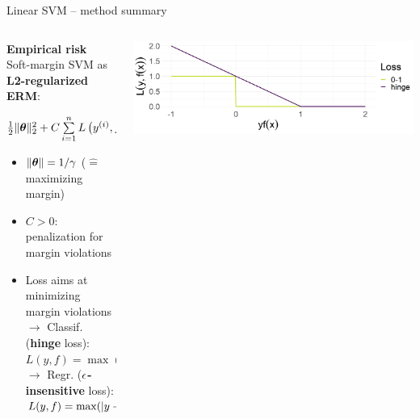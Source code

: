 \documentclass[11pt,compress,t,notes=noshow, xcolor=table]{beamer}
\newcommand{\highlight}[1]{\textcolor{hlcol}{\textbf{#1}}}
\begin{document}
\begin{vbframe}{Linear SVM -- method summary}
\begin{columns}[T, totalwidth = \textwidth]
\begin{column}{0.61\textwidth}
\highlight{Empirical risk} ~~ Soft-margin SVM as \textbf{L2-regularized ERM}: 
   \centerline{$\frac{1}{2} \|\bm{\theta}\|_2^2 + C \sum\limits_{i=1}^n L\left(y^{(i)}, f\left(\mathbf{x}^{(i)}\right)\right)$}
   \vspace{-\topsep}
\begin{itemize}
\setlength{\parskip}{0pt} 
\setlength{\itemsep}{0pt plus 1pt}
  \item $\|\bm{\theta}\| = 1 / \gamma$ ($\hat{=}$ maximizing margin) \\
  \item $C > 0$: penalization for margin violations
  \item Loss aims at minimizing margin violations\\
  $\rightarrow$ Classif. (\textbf{hinge} loss): $L(y,f) = \max(1-yf, 0)$ \\
  $\rightarrow$ Regr. (\textbf{$\epsilon$-insensitive} loss):   $L(y,f) = \max(|y-f| - \epsilon, 0)$ 
\end{itemize}
\vspace{-\topsep}
\end{column}
\begin{column}{0.38\textwidth}
\centering
\includegraphics[height=\textwidth, keepaspectratio=true]{
figure/plot_loss_hinge.png}

\end{column}
\end{columns}
\end{vbframe}
\end{document}

